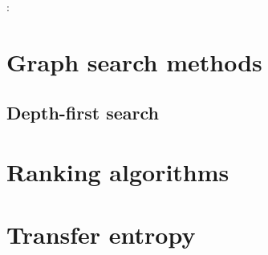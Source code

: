 \documentclass{article}
\begin{document}
\citet{Mauraya2003c}

\citet{RamMaurya2004}:

\section{Graph search methods}

\subsection{Depth-first search}




\section{Ranking algorithms}


\section{Transfer entropy}
\end{document}

